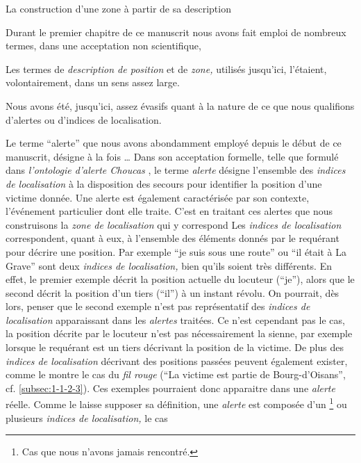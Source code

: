 
La construction d'une zone à partir de sa description 



Durant le premier chapitre de ce manuscrit nous avons fait emploi de
nombreux termes, dans une acceptation non scientifique, 

Les termes de \emph{description de position} et de \emph{zone,}
utilisés jusqu'ici, l'étaient, volontairement, dans un sens assez
large.


Nous avons été, jusqu'ici, assez évasifs quant à la nature de ce que
nous qualifions d'alertes ou d'indices de localisation.

Le terme \enquote{alerte} que nous avons abondamment employé depuis le
début de ce manuscrit, désigne à la fois …
%
Dans son acceptation formelle, telle que formulé dans
\emph{l’ontologie d'alerte Choucas} \autocite[\ac{oac},][]{Viry2019},
le terme \emph{alerte} désigne l'ensemble des \emph{indices de
  localisation} à la disposition des secours pour identifier la
position d'une victime donnée. Une alerte est également caractérisée
par son contexte, \ie l'événement particulier dont elle traite.
%
C'est en traitant ces alertes que nous construisons la \emph{zone de
localisation} qui y correspond
%
Les \emph{indices de localisation} correspondent, quant à eux, à
l'ensemble des éléments donnés par le requérant pour décrire une
position. Par exemple \enquote{je suis sous une route} ou \enquote{il
  était à La Grave} sont deux \emph{indices de localisation,} bien
qu'ils soient très différents. En effet, le premier exemple décrit la
position actuelle du locuteur (\enquote{je}), alors que le second
décrit la position d'un tiers (\enquote{il}) à un instant révolu. On
pourrait, dès lors, penser que le second exemple n'est pas
représentatif des \emph{indices de localisation} apparaissant dans les
\emph{alertes} traitées. Ce n'est cependant pas le cas, la position
décrite par le locuteur n'est pas nécessairement la sienne, par
exemple lorsque le requérant est un tiers décrivant la position de la
victime. De plus des \emph{indices de localisation} décrivant des
positions passées peuvent également exister, comme le montre le cas du
\emph{fil rouge} (\eg \enquote{La victime est partie de
  Bourg-d'Oisans}, cf. \autoref{subsec:1-1-2-3}). Ces exemples
pourraient donc apparaitre dans une \emph{alerte} réelle. Comme le
laisse supposer sa définition, une \emph{alerte} est composée d'un
\footnote{\label{note:cas_1_indice}Cas que nous n'avons jamais
  rencontré.} ou plusieurs \emph{indices de localisation,} le cas

